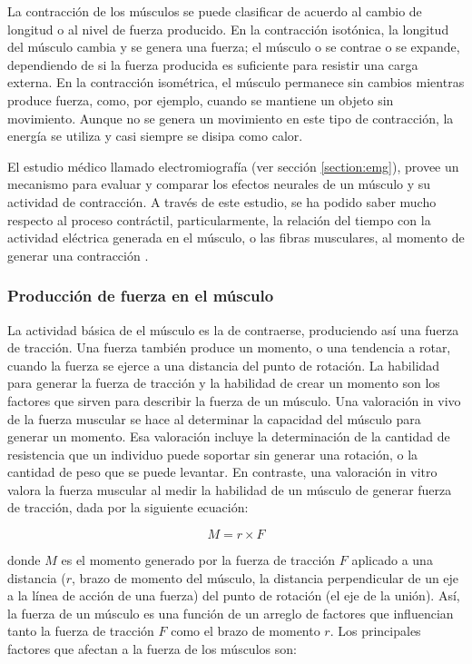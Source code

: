 La contracción de los músculos se puede clasificar de acuerdo al cambio de longitud o al nivel de fuerza producido. En la contracción isotónica, la longitud del músculo cambia y se genera una fuerza; el músculo o se contrae o se expande, dependiendo de si la fuerza producida es suficiente para resistir una carga externa. En la contracción isométrica, el músculo permanece sin cambios mientras produce fuerza, como, por ejemplo, cuando se mantiene un objeto sin movimiento. Aunque no se genera un movimiento en este tipo de contracción, la energía se utiliza y casi siempre se disipa como calor.

El estudio médico llamado electromiografía (ver sección \ref{section:emg}), provee un mecanismo para evaluar y comparar los efectos neurales de un músculo y su actividad de contracción. A través de este estudio, se ha podido saber mucho respecto al proceso contráctil, particularmente, la relación del tiempo con la actividad eléctrica generada en el músculo, o las fibras musculares, al momento de generar una contracción \cite{oatis2009kynesiology}.

\subsubsection{Producción de fuerza en el músculo}

La actividad básica de el músculo es la de contraerse, produciendo así una fuerza de tracción. Una fuerza también produce un momento, o una tendencia a rotar, cuando la fuerza se ejerce a una distancia del punto de rotación. La habilidad para generar la fuerza de tracción y la habilidad de crear un momento son los factores que sirven para describir la fuerza de un músculo. Una valoración in vivo de la fuerza muscular se hace al determinar la capacidad del músculo para generar un momento. Esa valoración incluye la determinación de la cantidad de resistencia que un individuo puede soportar sin generar una rotación, o la cantidad de peso que se puede levantar. En contraste, una valoración in vitro valora la fuerza muscular al medir la habilidad de un músculo de generar fuerza de tracción, dada por la siguiente ecuación:

\begin{equation}
	M = r \times F
\end{equation}

donde $M$ es el momento generado por la fuerza de tracción $F$ aplicado a una distancia ($r$, brazo de momento del músculo, la distancia perpendicular de un eje a la línea de acción de una fuerza) del punto de rotación (el eje de la unión). Así, la fuerza de un músculo es una función de un arreglo de factores que influencian tanto la fuerza de tracción $F$ como el brazo de momento $r$. Los principales factores que afectan a la fuerza de los músculos son:

